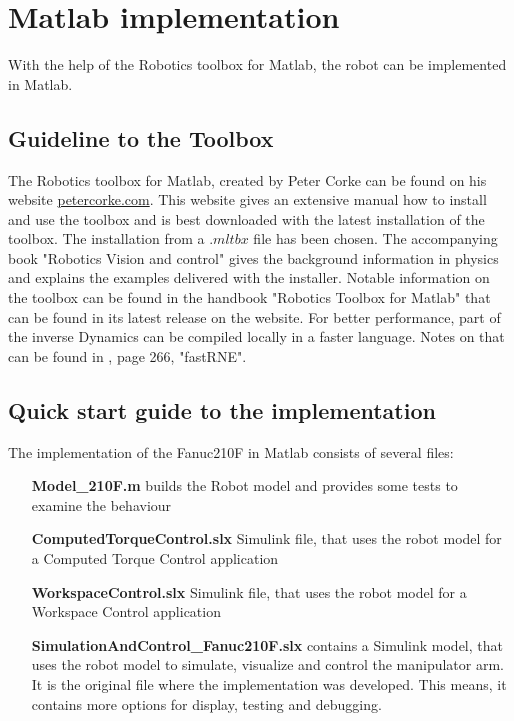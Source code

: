 \section{Matlab implementation}

With the help of the Robotics toolbox for Matlab, the robot can be implemented in Matlab.

\subsection{Guideline to the Toolbox}

The Robotics toolbox for Matlab, created by Peter Corke can be found on his website \url{petercorke.com}. This website gives an extensive manual how to install and use the toolbox and is best downloaded with the latest installation of the toolbox. The installation from a $.mltbx$ file has been chosen. 
The accompanying book "Robotics Vision and control" gives the background information in physics and explains the examples delivered with the installer. Notable information on the toolbox can be found in the handbook "Robotics Toolbox for Matlab" that can be found in its latest release on the website.
For better performance, part of the inverse Dynamics can be compiled locally in a faster language. Notes on that can be found in \cite{CorkeRoboticVisionControl}, page 266, "fastRNE".

\subsection{Quick start guide to the implementation}
The implementation of the Fanuc210F in Matlab consists of several files:\\
\begin{itemize}[wide=\parindent]
	\item[\textbf{Model_210F.m}] builds the Robot model and provides some tests to examine the behaviour
	\item[\textbf{ComputedTorqueControl.slx}] Simulink file, that uses the robot model for a Computed Torque Control application
	\item[\textbf{WorkspaceControl.slx}] Simulink file, that uses the robot model for a Workspace Control application
	\item[\textbf{SimulationAndControl_Fanuc210F.slx}] contains a Simulink model, that uses the robot model to simulate, visualize and control the manipulator arm. It is the original file where the implementation was developed. This means, it contains more options for display, testing and debugging.
\end{itemize}

